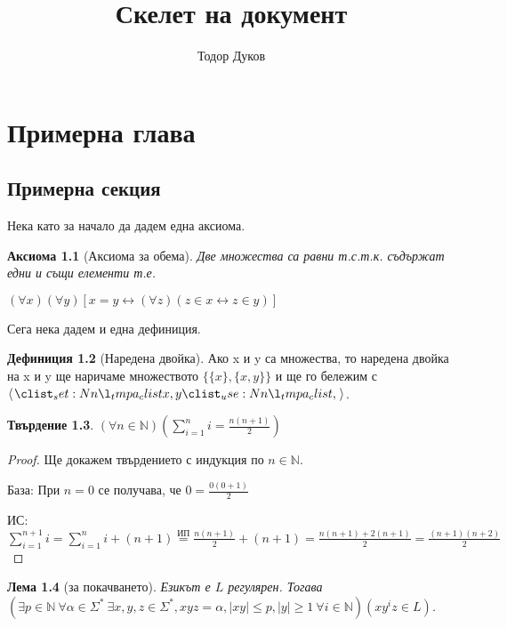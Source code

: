 \documentclass[a5paper]{report}
\title{Скелет на документ}
\author{Тодор Дуков}
\date{}
\theoremstyle{definition}
\newtheorem{definition}{Дефиниция}[section]
\theoremstyle{plain}
\newtheorem{claim}[definition]{Твърдение}
\newtheorem{axiom}[definition]{Аксиома}
\newtheorem{lemma}[definition]{Лема}
\theoremstyle{remark}
\theoremstyle{definition}
\begin{document}
\maketitle
\tableofcontents
\chapter{Примерна глава}
\section{Примерна секция}

Нека като за начало да дадем една аксиома.

\begin{axiom}[Аксиома за обема]
    Две множества са равни т.с.т.к. съдържат едни и същи елементи т.е.

    \centerline{$(\forall x) (\forall y) [x = y \leftrightarrow (\forall z)(z \in x \leftrightarrow z \in y)]$}
\end{axiom}

Сега нека дадем и една дефиниция.

\begin{definition}[Наредена двойка]
    Ако x и y са множества, то наредена двойка на x и y ще наричаме множеството $\{\{x\}, \{x, y\}\}$ и ще го бележим с $\opair{x, y}$.
\end{definition}

\begin{claim}
    $( \forall n \in \mathbb{N} ) ( \displaystyle\sum_{i=1}^{n}i = \frac{n(n+1)}{2} )$
\end{claim}

\begin{proof}
    Ще докажем твърдението с индукция по $n \in \mathbb{N}$.

    База: При $n = 0$ се получава, че $0 = \frac{0(0+1)}{2}$ \checkmark

    ИС: $\displaystyle\sum_{i=1}^{n+1}i = \displaystyle\sum_{i=1}^{n}i + (n + 1) \overset{\text{ИП}}{=} \frac{n(n+1)}{2} + (n + 1) = \frac{n(n+1) + 2(n+1)}{2} = \frac{(n+1)(n+2)}{2}$
\end{proof}

\begin{lemma}[за покачването]
    Езикът е $L$ регулярен.
    Тогава $(\exists p \in \mathbb{N} \: \forall \alpha \in \Sigma^* \: \exists x, y, z \in \Sigma^*, xyz = \alpha, |xy| \leq p, |y| \geq 1 \: \forall i \in \mathbb{N}) (xy^iz \in L)$.
\end{lemma}
\end{document}
